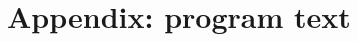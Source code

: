 \documentclass[a4paper]{article}
\begin{document}
\section{Appendix: program text}




%

%
\end{document}
